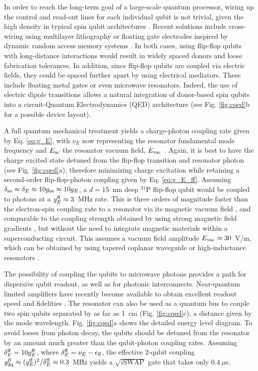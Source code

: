 In order to reach the long-term goal of a large-scale quantum processor, wiring up the control and read-out lines for each individual qubit is not trivial, given the high density in typical spin qubit architectures \cite{Vandersypen2016}. Recent solutions include cross-wiring using multilayer lithography \cite{Hill2015} or floating gate electrodes inspired by dynamic random access memory systems \cite{Veldhorst2017}. In both cases, using flip-flop qubits with long-distance interactions would result in widely spaced donors and loose fabrication tolerances. In addition, since flip-flop qubits are coupled via electric fields, they could be spaced further apart by using electrical mediators. These include floating metal gates \cite{Trifunovic2013} or even microwave resonators. Indeed, the use of electric dipole transitions allows a natural integration of donor-based spin qubits into a circuit-Quantum Electrodynamics (QED) architecture \cite{Blais2004,Childress2004,Xiang2012,Mi2017} (see Fig. \ref{fig:cqed}b for a possible device layout).

A full quantum mechanical treatment yields a charge-photon coupling rate given by Eq. \ref{eq:g_E}, with $\nu_E$ now representing the resonator fundamental mode frequency and $E_{\rm ac}$ the resonator vacuum field, $E_{\rm vac}$ . Again, it is best to have the charge excited state detuned from the flip-flop transition and resonator photon (see Fig. \ref{fig:cqed}a), therefore minimizing charge excitation while retaining a second-order flip-flop-photon coupling given by Eq. \ref{eq:g_E_ff}. Assuming $\delta_{\rm so}\approx\delta_E\approx 10g_{\rm so}\approx 10g_E$, a $d=15$~nm deep $^{31}$P flip-flop qubit would be coupled to photons at a $g^{\rm ff}_E\approx3$~MHz rate. This is three orders of magnitude faster than the electron-spin coupling rate to a resonator via its magnetic vacuum field \cite{Tosi2017,Haikka2017}, and comparable to the coupling strength obtained by using strong magnetic field gradients \cite{Hu2012,Viennot2015}, but without the need to integrate magnetic materials within a superconducting circuit. This assumes a vacuum field amplitude $E_{\rm vac}\approx 30$~V/m, which can be obtained by using tapered coplanar waveguide or high-inductance resonators \cite{Samkharadze2016}.

The possibility of coupling the qubits to microwave photons provides a path for dispersive qubit readout, as well as for photonic interconnects. Near-quantum limited amplifiers have recently become available to obtain excellent readout speed and fidelities \cite{Castellanos2008}. The resonator can also be used as a quantum bus to couple two spin qubits separated by as far as 1~cm (Fig. \ref{fig:cqed}c), a distance given by the mode wavelength. Fig. \ref{fig:cqed}a shows the detailed energy level diagram. To avoid losses from photon decay, the qubits should be detuned from the resonator by an amount much greater than the qubit-photon coupling rates. Assuming $\delta^{\rm ff}_E=10g_{E}^{\rm ff}$, where $\delta^{\rm ff}_E=\nu_E-\epsilon_{\rm ff}$, the effective 2-qubit coupling $g_{\rm 2q}^{\rm ff}\approx(g_E^{\rm ff})^2/\delta^{\rm ff}_E\approx 0.3$~MHz yields a $\sqrt{i\mathrm{SWAP}}$ gate that takes only $0.4~\mu$s.


